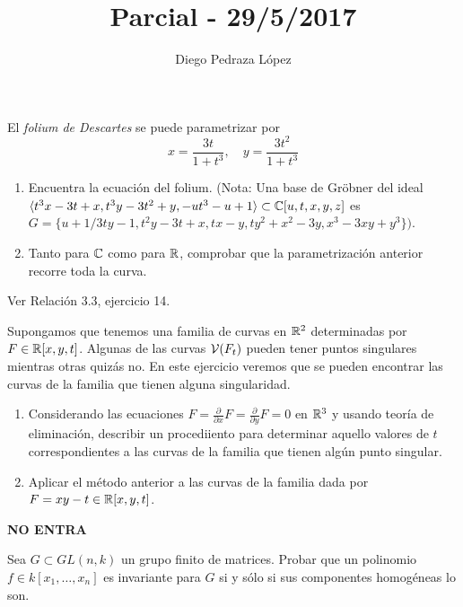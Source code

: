 \documentclass[twoside]{article}
\begin{document}
\title{Parcial - 29/5/2017}
\author{Diego Pedraza López}
\maketitle

\begin{ejercicio}{1}
El \emph{folium de Descartes} se puede parametrizar por
\[ x = \frac{3t}{1+t^3}, \quad y = \frac{3t^2}{1+t^3} \]
\begin{enumerate}
\item Encuentra la ecuación del folium.
(Nota: Una base de Gröbner del ideal $\langle t^3x-3t+x, t^3y - 3t^2+y, -ut^3 -u +1\rangle \subset \mathbb{C}[u,t,x,y,z]$ es $G = \{u+1/3ty-1, t^2y-3t+x, tx-y, ty^2+x^2-3y, x^3 - 3xy + y^3\})$.
\item Tanto para $\mathbb{C}$ como para $\mathbb{R}$, comprobar que la parametrización anterior recorre toda la curva.
\end{enumerate}
\end{ejercicio}
\begin{solucion}
Ver Relación 3.3, ejercicio 14.
\end{solucion}

\newpage
\begin{ejercicio}{2}
Supongamos que tenemos una familia de curvas en $\mathbb{R}^2$ determinadas por $F \in \mathbb{R}[x,y,t]$.
Algunas de las curvas $\mathcal{V}(F_t)$ pueden tener puntos singulares mientras otras quizás no.
En este ejercicio veremos que se pueden encontrar las curvas de la familia que tienen alguna singularidad.
\begin{enumerate}
\item Considerando las ecuaciones $F = \frac{\partial}{\partial x}F = \frac{\partial}{\partial y}F = 0$ en $\mathbb{R}^3$ y usando teoría de eliminación, describir un procediiento para determinar aquello valores de $t$ correspondientes a las curvas de la familia que tienen algún punto singular.
\item Aplicar el método anterior a las curvas de la familia dada por $F = xy - t \in \mathbb{R}[x,y,t]$.
\end{enumerate}
\end{ejercicio}
\begin{solucion}
\textbf{NO ENTRA}
\end{solucion}

\newpage

\begin{ejercicio}{3}
Sea $G \subset GL(n,k)$ un grupo finito de matrices.
Probar que un polinomio $f \in k[x_1,\dots,x_n]$ es invariante para $G$ si y sólo si sus componentes homogéneas lo son.
\end{ejercicio}
\end{document}
